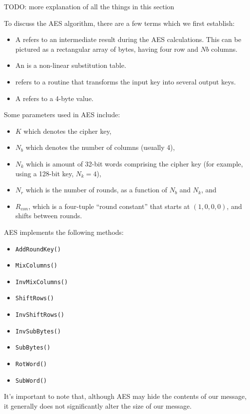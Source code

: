 TODO: more explanation of all the things in this section

To discuss the AES algorithm, there are a few terms which we first establish:
\begin{itemize}
    \item A  refers to an intermediate result during the AES calculations. This can be pictured as a rectangular array of bytes, having four row and $Nb$ columns.
    \item An  is a non-linear substitution table.
    \item {} refers to a routine that transforms the input key into several output keys.
    \item A  refers to a 4-byte value.
\end{itemize}

Some parameters used in AES include:
\begin{itemize}
    \item $K$ which denotes the cipher key,
    \item $N_b$ which denotes the number of columns (usually 4),
    \item $N_k$ which is amount of 32-bit words comprising the cipher key (for example, using a 128-bit key, $N_k = 4$),
    \item $N_r$ which is the number of rounds, as a function of $N_b$ and $N_k$, and
    \item $R_{con}$, which is a four-tuple ``round constant'' that starts at $(1,0,0,0)$, and shifts between rounds.
\end{itemize}

AES implements the following methods:
\begin{itemize}
    \item \texttt{AddRoundKey()}
    \item \texttt{MixColumns()}
    \item \texttt{InvMixColumns()}
    \item \texttt{ShiftRows()}
    \item \texttt{InvShiftRows()}
    \item \texttt{InvSubBytes()}
    \item \texttt{SubBytes()}
    \item \texttt{RotWord()}
    \item \texttt{SubWord()}
\end{itemize}

It's important to note that, although AES may hide the contents of our message, it generally does not significantly alter the size of our message.

